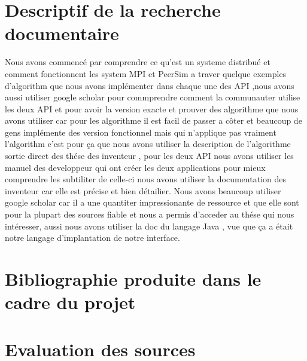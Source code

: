 \documentclass{article}
\begin{document}
		\section{Descriptif de la recherche documentaire}
		\indent Nous avons commencé par comprendre ce qu'est un systeme distribué et comment fonctionnent les system MPI et PeerSim a traver quelque exemples d'algorithm que nous avons implémenter dans chaque
		\indent une des API ,nous avons aussi utiliser google scholar pour commprendre comment la communauter utilise les deux API et pour avoir la version exacte et prouver des algorithme que nous avons utiliser
		\indent car pour les algorithme il est facil de passer a côter et beaucoup de gens implémente des version fonctionnel mais qui n'applique pas vraiment l'algorithm c'est pour ça que nous avons utiliser 
		\indent la description de l'algorithme sortie direct des thése des inventeur , pour les deux API nous avons utiliser les manuel des developpeur qui ont créer les deux applications pour mieux comprendre 
		\indent les subtiliter de celle-ci nous avons utiliser la documentation des inventeur car elle est précise et bien détailier.
		\newline
		\indent Nous avons beaucoup utiliser google scholar car il a une quantiter impressionante de ressource et que elle sont pour la plupart des sources fiable et nous a permis d'acceder au thése qui nous
		\indent intéresser, aussi nous avons utiliser la doc du langage Java , vue que ça a était notre langage d'implantation de notre interface.

		
		\section{Bibliographie produite dans le cadre du projet}

		\section{Evaluation des sources}
\end{document}
